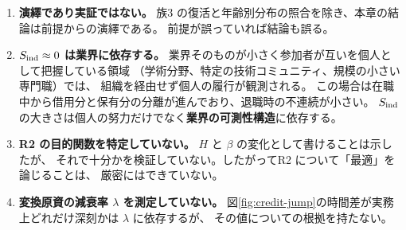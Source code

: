 \begin{enumerate}[label=(\arabic*)]
\item \textbf{演繹であり実証ではない。}
族3 の復活と年齢別分布の照合を除き、本章の結論は前提からの演繹である。
前提が誤っていれば結論も誤る。

\item \textbf{$S_{\rm ind}\approx 0$ は業界に依存する。}
業界そのものが小さく参加者が互いを個人として把握している領域
（学術分野、特定の技術コミュニティ、規模の小さい専門職）では、
組織を経由せず個人の履行が観測される。
この場合は在職中から借用分と保有分の分離が進んでおり、退職時の不連続が小さい。
$S_{\rm ind}$ の大きさは個人の努力だけでなく\textbf{業界の可測性構造}に依存する。

\item \textbf{R2 の目的関数を特定していない。}
$H$ と $\beta$ の変化として書けることは示したが、
それで十分かを検証していない。したがってR2 について「最適」を論じることは、
厳密にはできていない。

\item \textbf{変換原資の減衰率 $\lambda$ を測定していない。}
図\ref{fig:credit-jump}の時間差が実務上どれだけ深刻かは $\lambda$ に依存するが、
その値についての根拠を持たない。
\end{enumerate}
